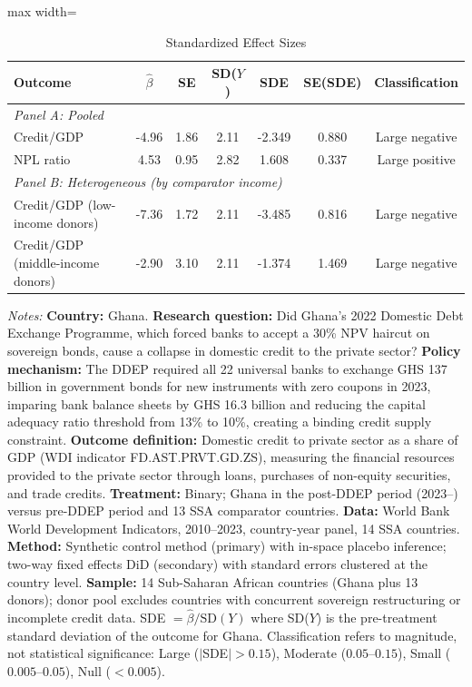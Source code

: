\begin{table}[t]
\centering
\caption{Standardized Effect Sizes}
\label{tab:sde}
\begin{adjustbox}{max width=\textwidth}
\begin{tabular}{lcccccc}
\toprule
Outcome & $\hat{\beta}$ & SE & SD($Y$) & SDE & SE(SDE) & Classification \\
\midrule
\multicolumn{7}{l}{\textit{Panel A: Pooled}} \\
Credit/GDP & -4.96 & 1.86 & 2.11 & -2.349 & 0.880 & Large negative \\
NPL ratio & 4.53 & 0.95 & 2.82 & 1.608 & 0.337 & Large positive \\
\midrule
\multicolumn{7}{l}{\textit{Panel B: Heterogeneous (by comparator income)}} \\
Credit/GDP (low-income donors) & -7.36 & 1.72 & 2.11 & -3.485 & 0.816 & Large negative \\
Credit/GDP (middle-income donors) & -2.90 & 3.10 & 2.11 & -1.374 & 1.469 & Large negative \\
\bottomrule
\end{tabular}
\end{adjustbox}
\par\vspace{0.3em}
{\footnotesize
\item \textit{Notes:} \textbf{Country:} Ghana. \textbf{Research question:} Did Ghana's 2022 Domestic Debt Exchange Programme, which forced banks to accept a 30\% NPV haircut on sovereign bonds, cause a collapse in domestic credit to the private sector? \textbf{Policy mechanism:} The DDEP required all 22 universal banks to exchange GHS 137 billion in government bonds for new instruments with zero coupons in 2023, imparing bank balance sheets by GHS 16.3 billion and reducing the capital adequacy ratio threshold from 13\% to 10\%, creating a binding credit supply constraint. \textbf{Outcome definition:} Domestic credit to private sector as a share of GDP (WDI indicator FD.AST.PRVT.GD.ZS), measuring the financial resources provided to the private sector through loans, purchases of non-equity securities, and trade credits. \textbf{Treatment:} Binary; Ghana in the post-DDEP period (2023--) versus pre-DDEP period and 13 SSA comparator countries. \textbf{Data:} World Bank World Development Indicators, 2010--2023, country-year panel, 14 SSA countries. \textbf{Method:} Synthetic control method (primary) with in-space placebo inference; two-way fixed effects DiD (secondary) with standard errors clustered at the country level. \textbf{Sample:} 14 Sub-Saharan African countries (Ghana plus 13 donors); donor pool excludes countries with concurrent sovereign restructuring or incomplete credit data. SDE $= \hat{\beta} / \text{SD}(Y)$ where SD($Y$) is the pre-treatment standard deviation of the outcome for Ghana. Classification refers to magnitude, not statistical significance: Large ($|$SDE$| > 0.15$), Moderate ($0.05$--$0.15$), Small ($0.005$--$0.05$), Null ($< 0.005$).
}
\end{table}
